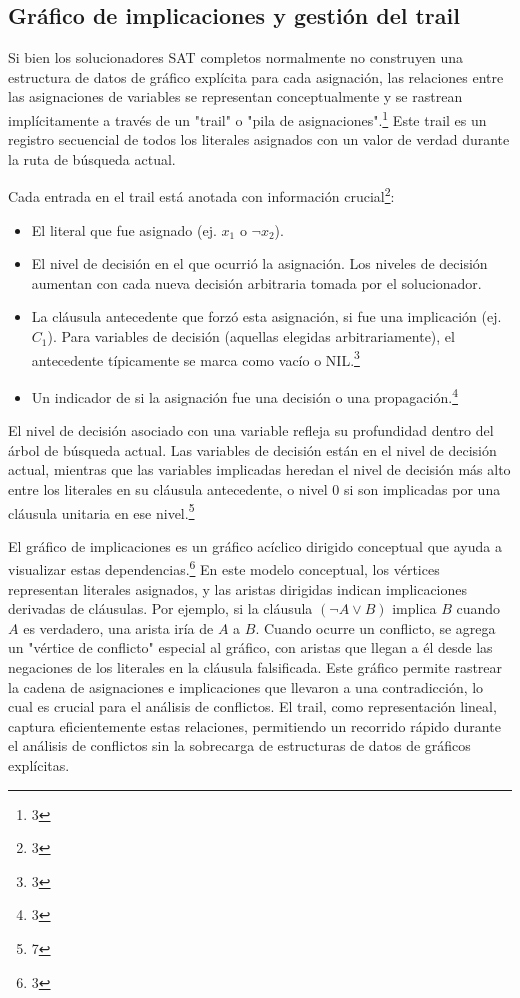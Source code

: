 \documentclass{article}
\begin{document}
\subsection{Gráfico de implicaciones y gestión del trail}

Si bien los solucionadores SAT completos normalmente no construyen una estructura de datos de gráfico explícita para cada asignación, las relaciones entre las asignaciones de variables se representan conceptualmente y se rastrean implícitamente a través de un "trail" o "pila de asignaciones".\footnote{3} Este trail es un registro secuencial de todos los literales asignados con un valor de verdad durante la ruta de búsqueda actual.

Cada entrada en el trail está anotada con información crucial\footnote{3}:

\begin{itemize}
\item El literal que fue asignado (ej. $x_1$ o $\neg x_2$).
\item El nivel de decisión en el que ocurrió la asignación. Los niveles de decisión aumentan con cada nueva decisión arbitraria tomada por el solucionador.
\item La cláusula antecedente que forzó esta asignación, si fue una implicación (ej. $C_1$). Para variables de decisión (aquellas elegidas arbitrariamente), el antecedente típicamente se marca como vacío o NIL.\footnote{3}
\item Un indicador de si la asignación fue una decisión o una propagación.\footnote{3}
\end{itemize}

El nivel de decisión asociado con una variable refleja su profundidad dentro del árbol de búsqueda actual. Las variables de decisión están en el nivel de decisión actual, mientras que las variables implicadas heredan el nivel de decisión más alto entre los literales en su cláusula antecedente, o nivel 0 si son implicadas por una cláusula unitaria en ese nivel.\footnote{7}

El gráfico de implicaciones es un gráfico acíclico dirigido conceptual que ayuda a visualizar estas dependencias.\footnote{3} En este modelo conceptual, los vértices representan literales asignados, y las aristas dirigidas indican implicaciones derivadas de cláusulas. Por ejemplo, si la cláusula $(\neg A \lor B)$ implica $B$ cuando $A$ es verdadero, una arista iría de $A$ a $B$. Cuando ocurre un conflicto, se agrega un "vértice de conflicto" especial al gráfico, con aristas que llegan a él desde las negaciones de los literales en la cláusula falsificada. Este gráfico permite rastrear la cadena de asignaciones e implicaciones que llevaron a una contradicción, lo cual es crucial para el análisis de conflictos. El trail, como representación lineal, captura eficientemente estas relaciones, permitiendo un recorrido rápido durante el análisis de conflictos sin la sobrecarga de estructuras de datos de gráficos explícitas.
\end{document}

